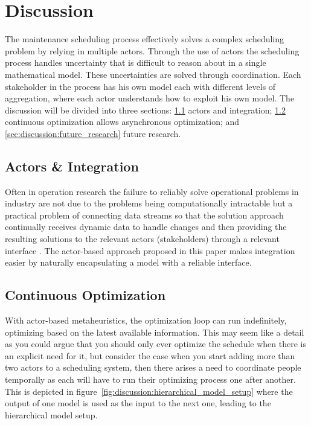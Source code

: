 \section{Discussion}
\label{sec:4-discussion}
The maintenance scheduling process effectively solves a complex scheduling problem by
relying in multiple actors. Through the use of actors the scheduling process handles
uncertainty that is difficult to reason about in a single mathematical model. These 
uncertainties are solved through coordination. Each stakeholder in the process has his own
model each with different levels of aggregation, where each actor understands 
how to exploit his own model.
The discussion will be divided into three sections: 
\ref{sec:discussion:actors_and_integration} 
actors and integration;
\ref{sec:discussion:continuous_optimization} 
continuous optimization allows asynchronous optimization; 
and \ref{sec:discussion:future_research} future research.

\subsection{Actors \& Integration}
\label{sec:discussion:actors_and_integration}
Often in operation research the failure to reliably solve operational
problems in  industry are not due to the problems being computationally
intractable \cite{gendreauHandbookMetaheuristics2019} but a practical
problem of connecting data streams so that the solution approach continually
receives dynamic data to handle changes and then providing the resulting
solutions to the relevant actors (stakeholders) through a relevant interface
\cite{meignanReviewTaxonomyInteractive2015}. The actor-based approach proposed
in this paper makes integration easier by naturally encapsulating a model with a
reliable interface.

\subsection{Continuous Optimization}
\label{sec:discussion:continuous_optimization}
With actor-based metaheuristics, the optimization loop can run indefinitely,
optimizing based on the latest available information. This may seem like a
detail as you could argue that you should only ever optimize the schedule
when there is an explicit need for it, but consider the case when you start
adding more than two actors to a scheduling system, then there arises a need
to coordinate people temporally as each will have to run their optimizing
process one after another. This is depicted in figure~\ref{fig:discussion:hierarchical_model_setup}
where the output of one model is used as the input to the next one, leading
to the hierarchical model setup.

